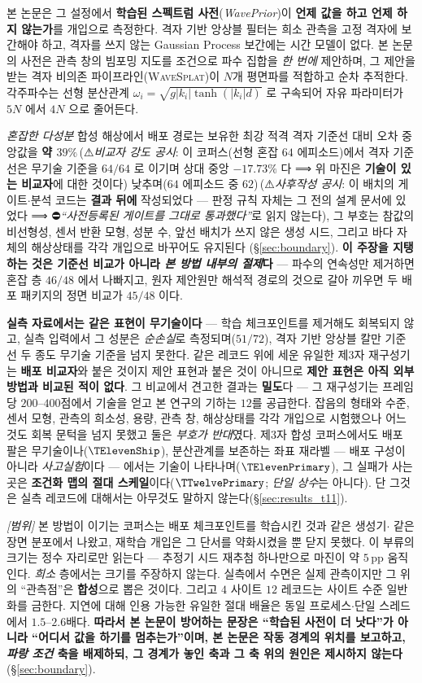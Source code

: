 \documentclass[11pt]{report}
\numberwithin{equation}{chapter}
\numberwithin{figure}{chapter}
\numberwithin{table}{chapter}
\newcommand{\WS}{\textsc{WaveSplat}}
\newcommand{\BOnePostHoc}{\,(⚠\emph{사후작성 공시}: 이 배치의 게이트$\cdot$분석
  코드는 \textbf{결과 뒤에} 작성되었다 --- 판정 규칙 자체는 그 전의 설계 문서에
  있었다 ⟹ ⛔\emph{``사전등록된 게이트를 그대로 통과했다''}로 읽지 않는다)}
\newcommand{\CmpSkillBOne}{\,(⚠\emph{비교자 강도 공시}: 이 코퍼스(선형 혼잡 $64$
  에피소드)에서 격자 기준선은 무기술 기준을 $64/64$ 로 이기며 상대 중앙 $-17.73\%$ 다
  ⟹ 위 마진은 \textbf{기술이 있는 비교자}에 대한 것이다)}
\begin{document}
본 논문은 그 설정에서 \textbf{학습된 스펙트럼 사전}(\emph{WavePrior})이 \textbf{언제 값을
하고 언제 하지 않는가}를 개입으로 측정한다. 격자 기반 앙상블 필터는 희소 관측을 고정
격자에 보간해야 하고, 격자를 쓰지 않는 Gaussian Process 보간에는 시간 모델이 없다. 본
논문의 사전은 관측 창의 빔포밍 지도를 조건으로 파수 집합을 \emph{한 번에} 제안하며, 그
제안을 받는 격자 비의존 파이프라인(\WS{})이 $N$개 평면파를 적합하고 순차 추적한다.
각주파수는 선형 분산관계 $\omega_i = \sqrt{g|k_i|\tanh(|k_i|d)}$ 로 구속되어 자유
파라미터가 $5N$ 에서 $4N$ 으로 줄어든다.

\emph{혼잡한 다성분} 합성 해상에서 배포 경로는 보유한 최강 적격 격자 기준선 대비 오차
중앙값을 \textbf{약 $39\%$}\CmpSkillBOne{} 낮추며($64$ 에피소드 중
$62$)\BOnePostHoc{}, 그 부호는 참값의 비선형성, 센서 반환 모형, 성분 수, 앞선 배치가
쓰지 않은 생성 시드, 그리고 바다 자체의 해상상태를 각각 개입으로 바꾸어도 유지된다
(\S\ref{sec:boundary}). \textbf{이 주장을 지탱하는 것은 기준선 비교가 아니라 \emph{본
방법 내부의 절제}다} --- 파수의 연속성만 제거하면 혼잡 층 $46/48$ 에서 나빠지고, 원자
제안원만 해석적 경로의 것으로 갈아 끼우면 두 배포 패키지의 정면 비교가 $45/48$ 이다.

\textbf{실측 자료에서는 같은 표현이 무기술이다} --- 학습 체크포인트를 제거해도 회복되지
않고, 실측 입력에서 그 성분은 \emph{순손실}로 측정되며($51/72$), 격자 기반 앙상블 칼만
기준선 두 종도 무기술 기준을 넘지 못한다. 같은 레코드 위에 세운 유일한 제3자 재구성기는 \textbf{배포
비교자}와 붙은 것이지 제안 표현과 붙은 것이 아니므로 \textbf{제안 표현은 아직 외부 방법과
비교된 적이 없다}. 그 비교에서 견고한 결과는 \textbf{밀도}다 --- 그 재구성기는 프레임당
$200$--$400$점에서 기술을 얻고 본 연구의 기하는 $12$를 공급한다. 잡음의 형태와 수준,
센서 모형, 관측의 희소성, 용량, 관측 창, 해상상태를 각각 개입으로 시험했으나 어느 것도
회복 문턱을 넘지 못했고 둘은 \emph{부호가 반대}였다. 제3자 합성 코퍼스에서도 배포 팔은
무기술이나($\TElevenShip$), 분산관계를 보존하는 좌표 재라벨 --- 배포 구성이 아니라
\emph{사고실험}이다 --- 에서는 기술이 나타나며($\TElevenPrimary$), 그 실패가 사는 곳은
\textbf{조건화 맵의 절대 스케일}이다($\TTwelvePrimary$; \emph{단일 상수}는 아니다).
단 그것은 실측 레코드에 대해서는 아무것도 말하지 않는다(\S\ref{sec:results_t11}).

\emph{[범위]} 본 방법이 이기는 코퍼스는 배포 체크포인트를 학습시킨 것과 같은 생성기$\cdot$
같은 장면 분포에서 나왔고, 재학습 개입은 그 단서를 약화시켰을 뿐 닫지 못했다. 이 부류의
크기는 정수 자리로만 읽는다 --- 추정기 시드 재추첨 하나만으로 마진이 약 $5$\,pp
움직인다. \emph{희소} 층에서는 크기를 주장하지 않는다. 실측에서 수면은 실제 관측이지만
그 위의 ``관측점''은 \textbf{합성}으로 뽑은 것이다. 그리고 $4$ 사이트 $12$ 레코드는
사이트 수준 일반화를 금한다. 지연에 대해 인용 가능한 유일한 절대 배율은 동일
프로세스$\cdot$단일 스레드에서 $1.5$--$2.6$배다. \textbf{따라서 본 논문이 방어하는 문장은
``학습된 사전이 더 낫다''가 아니라 ``어디서 값을 하기를 멈추는가''이며, 본 논문은 작동
경계의 위치를 보고하고, \emph{파랑 조건} 축을 배제하되, 그 경계가 놓인 축과 그 축 위의
원인은 제시하지 않는다}(\S\ref{sec:boundary}).
\end{document}
